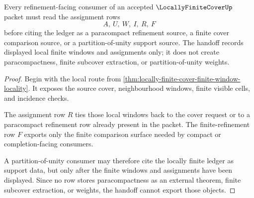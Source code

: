 \begin{theorem}
\label{thm:locally-finite-cover-refinement-handoff}
Every refinement-facing consumer of an accepted $\LocallyFiniteCoverUp$ packet must read the assignment rows
$$
A,\ U,\ W,\ I,\ R,\ F
$$
before citing the ledger as a paracompact refinement source, a finite cover comparison source, or a partition-of-unity support source. The handoff records displayed local finite windows and assignments only; it does not create paracompactness, finite subcover extraction, or partition-of-unity weights.
\end{theorem}
\begin{proof}
Begin with the local route from \autoref{thm:locally-finite-cover-finite-window-locality}. It exposes the source cover, neighbourhood windows, finite visible cells, and incidence checks.

The assignment row $R$ ties those local windows back to the cover request or to a paracompact refinement row already present in the packet. The finite-refinement row $F$ exports only the finite comparison surface needed by compact or completion-facing consumers.

A partition-of-unity consumer may therefore cite the locally finite ledger as support data, but only after the finite windows and assignments have been displayed. Since no row stores paracompactness as an external theorem, finite subcover extraction, or weights, the handoff cannot export those objects.
\end{proof}


\begin{closurestatus}{\LocallyFiniteCoverUp}
  \theoryclosure{\seedClosure}
  \formalstatus{\unformalizedV}
\end{closurestatus}
